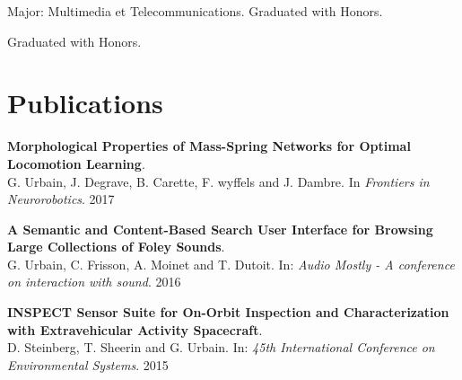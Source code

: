 \documentclass[a4paper]{deedy-resume} %
\begin{document}
\vspace{10pt}

\vspace{2pt}
Major: Multimedia et Telecommunications.
Graduated with Honors.

\vspace{3pt}
Graduated with Honors.

\vspace{15pt}


\section{Publications}

\textbf{Morphological Properties of Mass-Spring Networks for Optimal Locomotion Learning}. \\
G. Urbain, J. Degrave, B. Carette, F. wyffels and J. Dambre. In \textit{Frontiers in Neurorobotics}. 2017

\vspace{5pt}
\textbf{A Semantic and Content-Based Search User Interface for Browsing Large Collections of Foley Sounds}. \\
G. Urbain, C. Frisson, A. Moinet and T. Dutoit. In: \textit{Audio Mostly - A conference on interaction with sound}. 2016

\vspace{5pt}
\textbf{INSPECT Sensor Suite for On-Orbit Inspection and Characterization with Extravehicular Activity Spacecraft}.\\
D. Steinberg, T. Sheerin and G. Urbain. In: \textit{45th International Conference on Environmental Systems}. 2015

\vspace{15pt}
\end{document}
